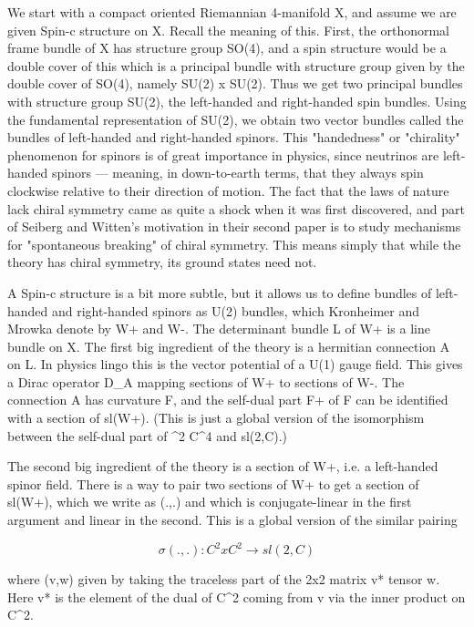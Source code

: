 We start with a compact oriented Riemannian 4-manifold X, and assume we
are given Spin-c structure on X.  Recall the meaning of this.  First,
the orthonormal frame bundle of X has structure group SO(4), and a spin
structure would be a double cover of this which is a principal bundle
with structure group given by the double cover of SO(4), namely SU(2) x
SU(2).  Thus we get two principal bundles with structure group SU(2),
the left-handed and right-handed spin bundles.  Using the fundamental
representation of SU(2), we obtain two vector bundles called the bundles
of left-handed and right-handed spinors.  This "handedness" or
"chirality" phenomenon for spinors is of great importance in physics,
since neutrinos are left-handed spinors --- meaning, in down-to-earth
terms, that they always spin clockwise relative to their direction of
motion.  The fact that the laws of nature lack chiral symmetry came as
quite a shock when it was first discovered, and part of Seiberg and
Witten's motivation in their second paper is to study mechanisms for
"spontaneous breaking" of chiral symmetry.  This means simply that while
the theory has chiral symmetry, its ground states need not.

A Spin-c structure is a bit more subtle, but it allows us to define
bundles of left-handed and right-handed spinors as U(2) bundles,
which Kronheimer and Mrowka denote by W+ and W-.  The determinant
bundle L of W+ is a line bundle on X.  The first big ingredient of the
theory is a hermitian connection A on L.  In physics lingo this is the
vector potential of a U(1) gauge field.  This gives a Dirac operator D_A
mapping sections of W+ to sections of W-.  The connection A has
curvature F, and the self-dual part F+ of F can be identified with a
section of sl(W+).  (This is just a global version of the isomorphism
between the self-dual part of \Lambda ^2 C^4 and sl(2,C).)

The second big ingredient of the theory is a section \Psi  of W+, i.e. a 
left-handed spinor field.  There is a way to pair two sections of 
W+ to get a section of sl(W+), which we write as \sigma (.,.) and which is 
conjugate-linear in the first argument and linear in the second.
This is a global version of the similar pairing 


$$

                     \sigma (.,.): C^2 x C^2 \to  sl(2,C)
$$
    

where \sigma (v,w) given by taking the traceless part of the 2x2 matrix 
v* tensor w.  Here v* is the element of the dual of C^2 coming from 
v via the inner product on C^2.

